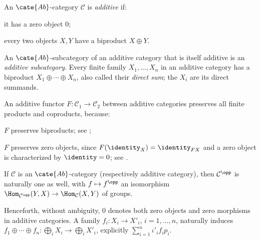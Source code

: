 \begin{definition}\label{def:additive-category}
	An $\cate{Ab}$-category $\mathcal C$ is \emph{additive} if:
	\begin{compactitem}
		\item it has a zero object $0$;
		\item every two objects $X,Y$ have a biproduct $X\oplus Y$.
	\end{compactitem}
	An $\cate{Ab}$-subcategory of an additive category that is itself additive is an \emph{additive subcategory}. Every finite family $X_1,\ldots,X_n$ in an additive category has a biproduct $X_1\oplus\cdots\oplus X_n$, also called their \emph{direct sum}; the $X_i$ are its direct summands.
\end{definition}

An additive functor $F:\mathcal C_1\to\mathcal C_2$ between additive categories preserves all finite products and coproducts, because:
\begin{compactitem}
	\item $F$ preserves biproducts; see \cite[Proposition~3.4.13]{Li1};
	\item $F$ preserves zero objects, since $F(\identity_X)=\identity_{FX}$ and a zero object is characterized by $\identity=0$; see \cite[Lemma~3.4.11]{Li1}.
\end{compactitem}

If $\mathcal C$ is an $\cate{Ab}$-category (respectively additive category), then $\mathcal C^{\opp}$ is naturally one as well, with $f\mapsto f^{\opp}$ an isomorphism $\Hom_{\mathcal C^{\opp}}(Y,X)\to\Hom_{\mathcal C}(X,Y)$ of groups.

Henceforth, without ambiguity, $0$ denotes both zero objects and zero morphisms in additive categories. A family $f_i:X_i\to X'_i$, $i=1,\ldots,n$, naturally induces $f_1\oplus\cdots\oplus f_n:\bigoplus_iX_i\to\bigoplus_iX'_i$, explicitly $\sum_{i=1}^n\iota'_if_ip_i$.

